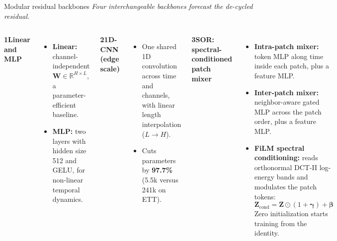 \documentclass[aspectratio=169]{beamer}
\begin{document}
\begin{frame}{Modular residual backbones}
\footnotesize
\textit{Four interchangeable backbones forecast the de-cycled residual.}\par
\vspace{0.3em}
\begin{columns}[T]
\textcolor{accent}{\textbf{1}}\quad \textbf{Linear and MLP}\par\vspace{0.3em}
\begin{itemize}
  \setlength{\itemsep}{0.3em}
  \item \textbf{Linear:} channel-independent $\mathbf{W} \in \mathbb{R}^{H \times L}$, a parameter-efficient baseline.
  \item \textbf{MLP:} two layers with hidden size 512 and GELU, for non-linear temporal dynamics.
\end{itemize}
\vspace{0.5em}
\textcolor{accent}{\textbf{2}}\quad \textbf{1D-CNN (edge scale)}\par\vspace{0.3em}
\begin{itemize}
  \setlength{\itemsep}{0.3em}
  \item One shared 1D convolution across time and channels, with linear length interpolation ($L \to H$).
  \item Cuts parameters by \textbf{97.7\%} (5.5k versus 241k on ETT).
\end{itemize}
\textcolor{accent}{\textbf{3}}\quad \textbf{SOR: spectral-conditioned patch mixer}\par\vspace{0.3em}
\begin{itemize}
  \setlength{\itemsep}{0.3em}
  \item \textbf{Intra-patch mixer:} token MLP along time inside each patch, plus a feature MLP.
  \item \textbf{Inter-patch mixer:} neighbor-aware gated MLP across the patch order, plus a feature MLP.
  \item \textbf{FiLM spectral conditioning:} reads orthonormal DCT-II log-energy bands and modulates the patch tokens:
  \[ \mathbf{Z}_{\text{cond}} = \mathbf{Z} \odot (1 + \boldsymbol{\gamma}) + \boldsymbol{\beta} \]
  Zero initialization starts training from the identity.
\end{itemize}
\end{columns}
\end{frame}
\end{document}
